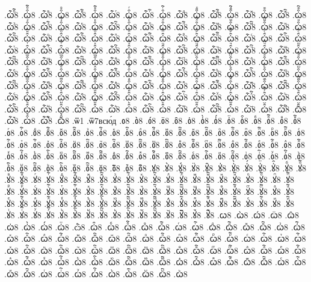 {.ѽⷠ҇8
.ꙍ҆̑ⷠ҇8
.ѽⷡ8
.ꙍ҆̑ⷡ8
.ѽⷡ҇8
.ꙍ҆̑ⷡ҇8
.ѽⷢ8
.ꙍ҆̑ⷢ8
.ѽⷢ҇8
.ꙍ҆̑ⷢ҇8
.ѽⷣ8
.ꙍ҆̑ⷣ8
.ѽⷣ҇8
.ꙍ҆̑ⷣ҇8
.ѽⷤ8
.ꙍ҆̑ⷤ8
.ѽⷤ҇8
.ꙍ҆̑ⷤ҇8
.ѽⷥ8
.ꙍ҆̑ⷥ8
.ѽⷥ҇8
.ꙍ҆̑ⷥ҇8
.ѽⷦ8
.ꙍ҆̑ⷦ8
.ѽⷦ҇8
.ꙍ҆̑ⷦ҇8
.ѽⷧ8
.ꙍ҆̑ⷧ8
.ѽⷧ҇8
.ꙍ҆̑ⷧ҇8
.ѽⷨ8
.ꙍ҆̑ⷨ8
.ѽⷨ҇8
.ꙍ҆̑ⷨ҇8
.ѽⷩ8
.ꙍ҆̑ⷩ8
.ѽⷩ҇8
.ꙍ҆̑ⷩ҇8
.ѽⷪ8
.ꙍ҆̑ⷪ8
.ѽⷪ҇8
.ꙍ҆̑ⷪ҇8
.ѽⷫ8
.ꙍ҆̑ⷫ8
.ѽⷫ҇8
.ꙍ҆̑ⷫ҇8
.ѽⷬ8
.ꙍ҆̑ⷬ8
.ѽⷬ҇8
.ꙍ҆̑ⷬ҇8
.ѽⷭ8
.ꙍ҆̑ⷭ8
.ѽⷭ҇8
.ꙍ҆̑ⷭ҇8
.ѽⷮ8
.ꙍ҆̑ⷮ8
.ѽⷮ҇8
.ꙍ҆̑ⷮ҇8
.ѽⷯ8
.ꙍ҆̑ⷯ8
.ѽⷯ҇8
.ꙍ҆̑ⷯ҇8
.ѽⷰ8
.ꙍ҆̑ⷰ8
.ѽⷰ҇8
.ꙍ҆̑ⷰ҇8
.ѽⷱ8
.ꙍ҆̑ⷱ8
.ѽⷱ҇8
.ꙍ҆̑ⷱ҇8
.ѽⷲ8
.ꙍ҆̑ⷲ8
.ѽⷲ҇8
.ꙍ҆̑ⷲ҇8
.ѽⷳ8
.ꙍ҆̑ⷳ8
.ѽⷳ҇8
.ꙍ҆̑ⷳ҇8
.ѽⷴ8
.ꙍ҆̑ⷴ8
.ѽⷴ҇8
.ꙍ҆̑ⷴ҇8
.ѽⷵ8
.ꙍ҆̑ⷵ8
.ѽⷵ҇8
.ꙍ҆̑ⷵ҇8
.ѽⷶ8
.ꙍ҆̑ⷶ8
.ѽⷶ҇8
.ꙍ҆̑ⷶ҇8
.ѽⷷ8
.ꙍ҆̑ⷷ8
.ѽⷷ҇8
.ꙍ҆̑ⷷ҇8
.ѽⷸ8
.ꙍ҆̑ⷸ8
.ѽⷸ҇8
.ꙍ҆̑ⷸ҇8
.ѽⷹ8
.ꙍ҆̑ⷹ8
.ѽⷹ҇8
.ꙍ҆̑ⷹ҇8
.ѽⷺ8
.ꙍ҆̑ⷺ8
.ѽⷺ҇8
.ꙍ҆̑ⷺ҇8
.ѽⷻ8
.ꙍ҆̑ⷻ8
.ѽⷻ҇8
.ꙍ҆̑ⷻ҇8
.ѽⷼ8
.ꙍ҆̑ⷼ8
.ѽⷼ҇8
.ꙍ҆̑ⷼ҇8
.ѽⷽ8
.ꙍ҆̑ⷽ8
.ѽⷽ҇8
.ꙍ҆̑ⷽ҇8
.ѽⷾ8
.ꙍ҆̑ⷾ8
.ѽⷾ҇8
.ꙍ҆̑ⷾ҇8
.ѽⷿ8
.ꙍ҆̑ⷿ8
.ѽⷿ҇8
.ꙍ҆̑ⷿ҇8
.ѽꙴ8
.ꙍ҆̑ꙴ8
.ѽꙴ҇8
.ꙍ҆̑ꙴ҇8
.ѽꙵ8
.ꙍ҆̑ꙵ8
.ѽꙵ҇8
.ꙍ҆̑ꙵ҇8
.ѽꙶ8
.ꙍ҆̑ꙶ8
.ѽꙶ҇8
.ꙍ҆̑ꙶ҇8
.ѽꙷ8
.ꙍ҆̑ꙷ8
.ѽꙷ҇8
.ꙍ҆̑ꙷ҇8
.ѽꙸ8
.ꙍ҆̑ꙸ8
.ѽꙸ҇8
.ꙍ҆̑ꙸ҇8
.ѽꙹ8
.ꙍ҆̑ꙹ8
.ѽꙹ҇8
.ꙍ҆̑ꙹ҇8
.ѽꙺ8
.ꙍ҆̑ꙺ8
.ѽꙺ҇8
.ꙍ҆̑ꙺ҇8
.ѽꙻ8
.ꙍ҆̑ꙻ8
.ѽꙻ҇8
.ꙍ҆̑ꙻ҇8
.ѽ꙼8
.ꙍ҆̑꙼8
.ѽ꙼҇8
.ꙍ҆̑꙼҇8
.ѽ꙽8
.ꙍ҆̑꙽8
.ѽ꙽҇8
.ꙍ҆̑꙽҇8
.ѿ1
.ѿ7всю́д
.ᲂ8
.ᲂ̀8
.ᲂ́8
.ᲂ̈8
.ᲂ̑8
.ᲂ҆8
.ᲂ҆̀8
.ᲂ҆́8
.ᲂ҆̈8
.ᲂ҆̑8
.ᲂⷠ8
.ᲂⷠ҇8
.ᲂⷡ8
.ᲂⷡ҇8
.ᲂⷢ8
.ᲂⷢ҇8
.ᲂⷣ8
.ᲂⷣ҇8
.ᲂⷤ8
.ᲂⷤ҇8
.ᲂⷥ8
.ᲂⷥ҇8
.ᲂⷦ8
.ᲂⷦ҇8
.ᲂⷧ8
.ᲂⷧ҇8
.ᲂⷨ8
.ᲂⷨ҇8
.ᲂⷩ8
.ᲂⷩ҇8
.ᲂⷪ8
.ᲂⷪ҇8
.ᲂⷫ8
.ᲂⷫ҇8
.ᲂⷬ8
.ᲂⷬ҇8
.ᲂⷭ8
.ᲂⷭ҇8
.ᲂⷮ8
.ᲂⷮ҇8
.ᲂⷯ8
.ᲂⷯ҇8
.ᲂⷰ8
.ᲂⷰ҇8
.ᲂⷱ8
.ᲂⷱ҇8
.ᲂⷲ8
.ᲂⷲ҇8
.ᲂⷳ8
.ᲂⷳ҇8
.ᲂⷴ8
.ᲂⷴ҇8
.ᲂⷵ8
.ᲂⷵ҇8
.ᲂⷶ8
.ᲂⷶ҇8
.ᲂⷷ8
.ᲂⷷ҇8
.ᲂⷸ8
.ᲂⷸ҇8
.ᲂⷹ8
.ᲂⷹ҇8
.ᲂⷺ8
.ᲂⷺ҇8
.ᲂⷻ8
.ᲂⷻ҇8
.ᲂⷼ8
.ᲂⷼ҇8
.ᲂⷽ8
.ᲂⷽ҇8
.ᲂⷾ8
.ᲂⷾ҇8
.ᲂⷿ8
.ᲂⷿ҇8
.ᲂꙴ8
.ᲂꙴ҇8
.ᲂꙵ8
.ᲂꙵ҇8
.ᲂꙶ8
.ᲂꙶ҇8
.ᲂꙷ8
.ᲂꙷ҇8
.ᲂꙸ8
.ᲂꙸ҇8
.ᲂꙹ8
.ᲂꙹ҇8
.ᲂꙺ8
.ᲂꙺ҇8
.ᲂꙻ8
.ᲂꙻ҇8
.ᲂ꙼8
.ᲂ꙼҇8
.ᲂ꙽8
.ᲂ꙽҇8
.ꙋ8
.ꙋ̀8
.ꙋ́8
.ꙋ̈8
.ꙋ̑8
.ꙋ҆8
.ꙋ҆̀8
.ꙋ҆́8
.ꙋ҆̈8
.ꙋ҆̑8
.ꙋⷠ8
.ꙋⷠ҇8
.ꙋⷡ8
.ꙋⷡ҇8
.ꙋⷢ8
.ꙋⷢ҇8
.ꙋⷣ8
.ꙋⷣ҇8
.ꙋⷤ8
.ꙋⷤ҇8
.ꙋⷥ8
.ꙋⷥ҇8
.ꙋⷦ8
.ꙋⷦ҇8
.ꙋⷧ8
.ꙋⷧ҇8
.ꙋⷨ8
.ꙋⷨ҇8
.ꙋⷩ8
.ꙋⷩ҇8
.ꙋⷪ8
.ꙋⷪ҇8
.ꙋⷫ8
.ꙋⷫ҇8
.ꙋⷬ8
.ꙋⷬ҇8
.ꙋⷭ8
.ꙋⷭ҇8
.ꙋⷮ8
.ꙋⷮ҇8
.ꙋⷯ8
.ꙋⷯ҇8
.ꙋⷰ8
.ꙋⷰ҇8
.ꙋⷱ8
.ꙋⷱ҇8
.ꙋⷲ8
.ꙋⷲ҇8
.ꙋⷳ8
.ꙋⷳ҇8
.ꙋⷴ8
.ꙋⷴ҇8
.ꙋⷵ8
.ꙋⷵ҇8
.ꙋⷶ8
.ꙋⷶ҇8
.ꙋⷷ8
.ꙋⷷ҇8
.ꙋⷸ8
.ꙋⷸ҇8
.ꙋⷹ8
.ꙋⷹ҇8
.ꙋⷺ8
.ꙋⷺ҇8
.ꙋⷻ8
.ꙋⷻ҇8
.ꙋⷼ8
.ꙋⷼ҇8
.ꙋⷽ8
.ꙋⷽ҇8
.ꙋⷾ8
.ꙋⷾ҇8
.ꙋⷿ8
.ꙋⷿ҇8
.ꙋꙴ8
.ꙋꙴ҇8
.ꙋꙵ8
.ꙋꙵ҇8
.ꙋꙶ8
.ꙋꙶ҇8
.ꙋꙷ8
.ꙋꙷ҇8
.ꙋꙸ8
.ꙋꙸ҇8
.ꙋꙹ8
.ꙋꙹ҇8
.ꙋꙺ8
.ꙋꙺ҇8
.ꙋꙻ8
.ꙋꙻ҇8
.ꙋ꙼8
.ꙋ꙼҇8
.ꙋ꙽8
.ꙋ꙽҇8
.ꙍ8
.ꙍ̀8
.ꙍ́8
.ꙍ̈8
.ꙍ̑8
.ꙍ҆8
.ꙍ҆̀8
.ꙍ҆́8
.ꙍ҆̈8
.ѽ8
.ꙍ҆̑8
.ꙍⷠ8
.ꙍⷠ҇8
.ꙍⷡ8
.ꙍⷡ҇8
.ꙍⷢ8
.ꙍⷢ҇8
.ꙍⷣ8
.ꙍⷣ҇8
.ꙍⷤ8
.ꙍⷤ҇8
.ꙍⷥ8
.ꙍⷥ҇8
.ꙍⷦ8
.ꙍⷦ҇8
.ꙍⷧ8
.ꙍⷧ҇8
.ꙍⷨ8
.ꙍⷨ҇8
.ꙍⷩ8
.ꙍⷩ҇8
.ꙍⷪ8
.ꙍⷪ҇8
.ꙍⷫ8
.ꙍⷫ҇8
.ꙍⷬ8
.ꙍⷬ҇8
.ꙍⷭ8
.ꙍⷭ҇8
.ꙍⷮ8
.ꙍⷮ҇8
.ꙍⷯ8
.ꙍⷯ҇8
.ꙍⷰ8
.ꙍⷰ҇8
.ꙍⷱ8
.ꙍⷱ҇8
.ꙍⷲ8
.ꙍⷲ҇8
.ꙍⷳ8
.ꙍⷳ҇8
.ꙍⷴ8
.ꙍⷴ҇8
.ꙍⷵ8
.ꙍⷵ҇8
.ꙍⷶ8
.ꙍⷶ҇8
.ꙍⷷ8
.ꙍⷷ҇8
.ꙍⷸ8
.ꙍⷸ҇8
.ꙍⷹ8
.ꙍⷹ҇8
.ꙍⷺ8
.ꙍⷺ҇8
.ꙍⷻ8
.ꙍⷻ҇8
.ꙍⷼ8
.ꙍⷼ҇8
.ꙍⷽ8
.ꙍⷽ҇8
.ꙍⷾ8
.ꙍⷾ҇8
.ꙍⷿ8
.ꙍⷿ҇8
.ꙍꙴ8
.ꙍꙴ҇8
.ꙍꙵ8
.ꙍꙵ҇8
.ꙍꙶ8
.ꙍꙶ҇8
.ꙍꙷ8
.ꙍꙷ҇8
.ꙍꙸ8
.ꙍꙸ҇8
.ꙍꙹ8
.ꙍꙹ҇8
.ꙍꙺ8
}
